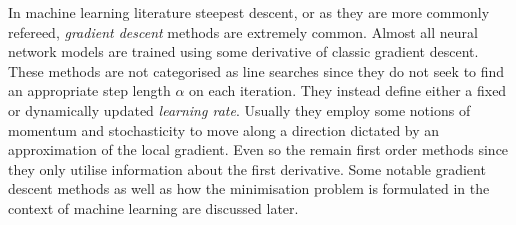\documentclass{article}
\begin{document}
    In machine learning literature steepest descent, or as they are more commonly refereed, \textit{gradient descent} methods are extremely common.
    Almost all neural network models are trained using some derivative of classic gradient descent.
    These methods are not categorised as line searches since they do not seek to find an appropriate step length $\alpha$ on each iteration.
    They instead define either a fixed or dynamically updated \textit{learning rate}.
    Usually they employ some notions of momentum and stochasticity to move along a direction dictated by an approximation of the local gradient.
    Even so the remain first order methods since they only utilise information about the first derivative.
    Some notable gradient descent methods as well as how the minimisation problem is formulated in the context of machine learning are discussed later.
\end{document}
